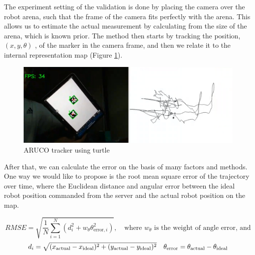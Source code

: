 The experiment setting of the validation is done by placing the camera over the robot arena, such that the frame of the camera fits perfectly with the arena. This allows us to estimate the actual measurement by calculating from the size of the arena, which is known prior. The method then starts by tracking the position,$(x, y, \theta)$  , of the marker in the camera frame, and then we relate it to the internal representation map (Figure \ref{fig:aruco-tracker}). 

\begin{figure}[H]
    \centering
    \includegraphics[width=0.9\linewidth]{assets/images/odometry/arcuo_tracker.png}
    \caption{ARUCO tracker using turtle}
    \label{fig:aruco-tracker}
\end{figure}

After that, we can calculate the error on the basis of many factors and methods. One way we would like to propose is the root mean square error of the trajectory over time, where the Euclidean distance and angular error between the ideal robot position commanded from the server and the actual robot position on the map.

\[
RMSE = \sqrt{\frac{1}{N} \sum_{i=1}^{N} (d_i^2 + w_{\theta} \theta_{\text{error}, i}^2)}, \quad \text{where } w_{\theta} \text{ is the weight of angle error, and}
\]
\[
\begin{array}{c c}
d_i = \sqrt{(x_{\text{actual}} - x_{\text{ideal}})^2 + (y_{\text{actual}} - y_{\text{ideal}})^2} & 
\theta_{\text{error}} = \theta_{\text{actual}} - \theta_{\text{ideal}}
\end{array}
\]


